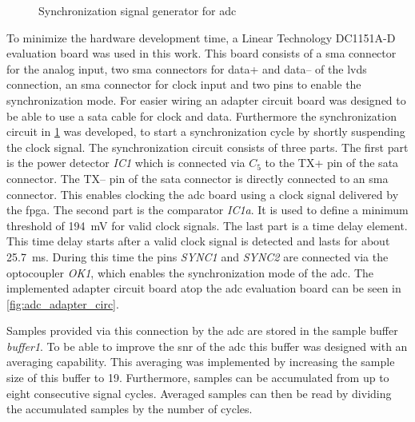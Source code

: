 \documentclass[12pt,a4paper,parskip=full,abstract=true,BCOR=12mm,twoside,open=right]{scrreprt}
\makeatletter
\newcommand\currentcoordinate{\the\tikz@lastxsaved,\the\tikz@lastysaved}
\def\device#1{\textit{#1}}
\makeatother
\begin{document}
\begin{figure}[htb]
{
    }
    \caption{Synchronization signal generator for \gls{adc}}
    \label{fig:adc_adapter}
\end{figure}

To minimize the hardware development time, a Linear Technology DC1151A-D evaluation board was used
in this work. This board consists of a \gls{sma} connector for the analog input, two \gls{sma}
connectors for data+ and data-- of the \gls{lvds} connection, an \gls{sma} connector for clock input
and two pins to enable the synchronization mode. For easier wiring an adapter circuit
board was designed to be able to use a \gls{sata} cable for clock and data. Furthermore the synchronization
circuit in \cref{fig:adc_adapter} was developed, to start a synchronization cycle by shortly suspending the clock
signal. The synchronization circuit consists of three parts. The first part is the power detector \device{IC1}
which is connected via \device{$C_5$} to the TX+ pin of the \gls{sata} connector. The TX-- pin of the
\gls{sata} connector is directly connected to an \gls{sma} connector.
This enables clocking the \gls{adc} board using a clock signal delivered by the \gls{fpga}. The second part
is the comparator \device{IC1a}. It is used to define a minimum threshold of \SI{194}{\milli\volt}
for valid clock signals. The last part is a time delay element. This time delay starts after a valid clock
signal is detected and lasts for about \SI{25.7}{\milli\second}. During
this time the pins \device{SYNC1} and \device{SYNC2} are connected via the optocoupler \device{OK1}, which
enables the synchronization mode of the \gls{adc}. The implemented adapter circuit board atop the
\gls{adc} evaluation board can be seen in \cref{fig:adc_adapter_circ}.

Samples provided via this connection by the \gls{adc} are stored in the sample buffer
\device{buffer1}. To be able to improve the \gls{snr} of the \gls{adc} this buffer
was designed with an averaging capability\cite{ad_mt004}. This averaging was implemented by increasing
the sample size of this buffer to \SI{19}{\bit}. Furthermore, samples can be accumulated
from up to eight consecutive signal cycles. Averaged samples can then be read by dividing the
accumulated samples by the number of cycles.
\end{document}
